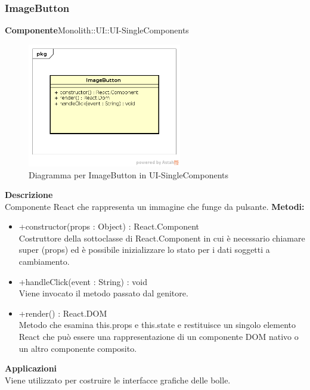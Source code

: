 \subsubsection{ImageButton}
\textbf{Componente}Monolith::UI::UI-SingleComponents\\
   \FloatBarrier
   \begin{figure}[ht]
   \centering
   \includegraphics[width=0.6\textwidth]{img/single-ImageButton}
   \caption{{Diagramma per ImageButton in UI-SingleComponents}}
\end{figure}
\FloatBarrier
\textbf{Descrizione}\\
Componente React che rappresenta un immagine che funge da pulsante.
\textbf{Metodi:} \begin{itemize}\item +constructor(props : Object) : React.Component \\Costruttore della sottoclasse di React.Component in cui è necessario chiamare super (props) ed è possibile inizializzare lo stato per i dati soggetti a cambiamento.\item +handleClick(event : String) : void  \\Viene invocato il metodo passato dal genitore. \item +render() : React.DOM \\Metodo che esamina this.props e this.state e restituisce un singolo elemento React che può essere una rappresentazione di un componente DOM nativo o un altro componente composito.\end{itemize} 


\textbf{Applicazioni}\\
Viene utilizzato per costruire le interfacce grafiche delle bolle. 


\clearpage

